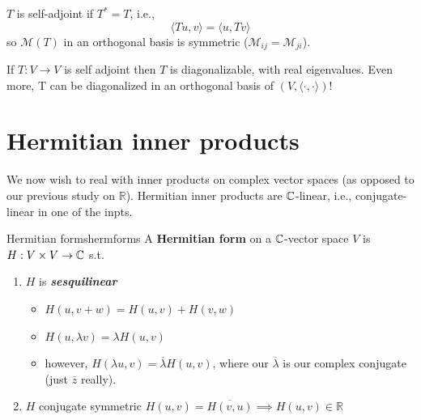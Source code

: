 \documentclass[12pt,oneside]{report}
\begin{document}




\begin{definition}
  \( T \) is self-adjoint if \( T^* = T \), i.e., 
  \begin{displaymath}
    \langle T u , v \rangle = \langle u,Tv \rangle 
  \end{displaymath}
  so \( \mathcal{M}(T) \) in an orthogonal basis is symmetric (\( \mathcal{M}_{ij}=\mathcal{M}_{ji} \)). 
\end{definition}



\begin{theorem}  
  If \( T : V \to  V  \) is self adjoint then \( T \) is diagonalizable, with real eigenvalues. Even more, T can be diagonalized in an orthogonal basis of \( ( V, \langle \cdot , \cdot  \rangle ) \)!  

\end{theorem}



\section{Hermitian inner products}

We now wish to real with inner products on complex vector spaces (as opposed to our previous study on \( \mathbb{R} \)). Hermitian inner products are \( \CC \)-linear, i.e., conjugate-linear in one of the inpts. 

\begin{definition}{Hermitian forms}{hermforms}
A \textbf{Hermitian form} on a \( \CC \)-vector space \( V \) is \( H: V\times V \to  \CC[] \) s.t.
\begin{enumerate}
  \item \( H \) is \textbf{\textit{sesquilinear}}
    \begin{itemize}
      \item \( H(u,v+w)=H(u,v)+H(v,w)\)
      \item \( H( u, \lambda v) =\lambda  H (u,v)\)
      \item however, \( H(\lambda u, v)= \overline{\lambda }  H(u,v) \), where our \( \overline{\lambda }  \) is our complex conjugate (just \( \overline{z}  \) really). 
    \end{itemize}
  \item \( H \) conjugate symmetric \( H(u,v)=\overline{H(v,u)} \implies H(u,v) \in  \mathbb{R} \)
\end{enumerate}
\end{definition}
\end{document}
